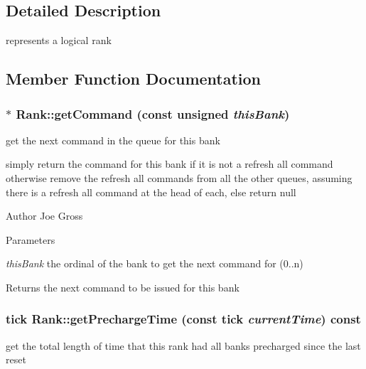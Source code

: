 \subsection{Detailed Description}
represents a logical rank 

\subsection{Member Function Documentation}
\subsubsection[{getCommand}]{ $\ast$ Rank::getCommand (const unsigned {\em thisBank})}\label{class_d_r_a_msim_i_i_1_1_rank_a213753498fc0af7dea14cbfa5e53e3df}


get the next command in the queue for this bank 

simply return the command for this bank if it is not a refresh all command otherwise remove the refresh all commands from all the other queues, assuming there is a refresh all command at the head of each, else return null \begin{DoxyAuthor}{Author}
Joe Gross 
\end{DoxyAuthor}

\begin{DoxyParams}{Parameters}
\item[{\em thisBank}]the ordinal of the bank to get the next command for (0..n) \end{DoxyParams}
\begin{DoxyReturn}{Returns}
the next command to be issued for this bank 
\end{DoxyReturn}
\subsubsection[{getPrechargeTime}]{\setlength{\rightskip}{0pt plus 5cm}tick Rank::getPrechargeTime (const tick {\em currentTime}) const}\label{class_d_r_a_msim_i_i_1_1_rank_a6826601315567089a09b6a53023672d9}


get the total length of time that this rank had all banks precharged since the last reset 

